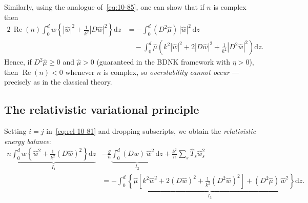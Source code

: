 Similarly, using the analogue of~\eqref{eq:10-85}, one can show that
if $n$ is complex then
\begin{align}\label{eq:rel-10-87}
  2\,\operatorname{Re}(n)\int_{0}^{d}
    w\!\left\{|\hat{w}|^{2}
    + \frac{1}{k^{2}}|D\hat{w}|^{2}\right\}\mathrm{d}z
  &= -\int_{0}^{d}(D^{2}\hat{\mu})\,|\hat{w}|^{2}\,\mathrm{d}z
  \nonumber\\
  &\quad
  - \int_{0}^{d}\hat{\mu}\!\left(k^{2}|\hat{w}|^{2}
    + 2|D\hat{w}|^{2}
    + \frac{1}{k^{2}}|D^{2}\hat{w}|^{2}\right)\mathrm{d}z.
\end{align}
Hence, if $D^{2}\hat{\mu} \geqslant 0$ and $\hat{\mu} > 0$
(guaranteed in the BDNK framework with $\eta > 0$), then
$\operatorname{Re}(n) < 0$ whenever $n$ is complex, so
\emph{overstability cannot occur} --- precisely as in the classical
theory.

\subsection{The relativistic variational principle}\label{ssec:rel-10-var}

Setting $i = j$ in~\eqref{eq:rel-10-81} and dropping subscripts, we
obtain the \emph{relativistic energy balance}:
\begin{align}\label{eq:rel-10-88}
  n\underbrace{\int_{0}^{d}
    w\!\left\{\hat{w}^{2}
    + \frac{1}{k^{2}}(D\hat{w})^{2}\right\}\mathrm{d}z}_{I_{1}}
  &- \frac{g}{n}\underbrace{\int_{0}^{d}
    (Dw)\,\hat{w}^{2}\,\mathrm{d}z}_{I_{2}}
  + \frac{k^{2}}{n}\sum_{s}\hat{T}_{s}\hat{w}_{s}^{2}
  \nonumber\\
  &= -\underbrace{\int_{0}^{d}\!\left\{
    \hat{\mu}\!\left[k^{2}\hat{w}^{2}
    + 2(D\hat{w})^{2}
    + \frac{1}{k^{2}}(D^{2}\hat{w})^{2}\right]
    + (D^{2}\hat{\mu})\,\hat{w}^{2}
  \right\}\mathrm{d}z}_{I_{3}}.
\end{align}

